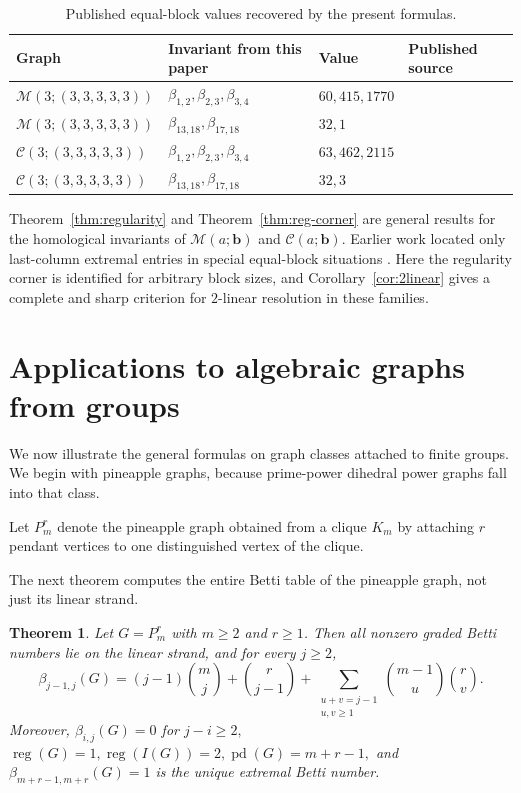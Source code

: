 \documentclass[12pt]{article}
\newtheorem{theorem}{Theorem}[section]
\theoremstyle{definition}
\theoremstyle{remark}
\DeclareMathOperator{\reg}{reg}
\DeclareMathOperator{\pd}{pd}
\newcommand{\MM}{\mathcal{M}}
\newcommand{\CC}{\mathcal{C}}
\newcommand{\bk}[1]{\mathbf{#1}}
\begin{document}
	\begin{table}[H]
		\centering
		\caption{Published equal-block values recovered by the present formulas.}
		\label{tab:published-compare}
		\begin{tabular}{@{}llll@{}}
			\toprule
			Graph & Invariant from this paper & Value & Published source \\ \midrule
			$\MM(3;(3,3,3,3,3))$ & $\beta_{1,2},\beta_{2,3},\beta_{3,4}$ & $60,415,1770$ & \cite{Rather2024} \\
			$\MM(3;(3,3,3,3,3))$ & $\beta_{13,18},\beta_{17,18}$ & $32,1$ & \cite{Rather2024} \\
			$\CC(3;(3,3,3,3,3))$ & $\beta_{1,2},\beta_{2,3},\beta_{3,4}$ & $63,462,2115$ & \cite{Rather2024} \\
			$\CC(3;(3,3,3,3,3))$ & $\beta_{13,18},\beta_{17,18}$ & $32,3$ & \cite{Rather2024} \\ \bottomrule
		\end{tabular}
	\end{table}
	
	
	
	Theorem~\ref{thm:regularity} and Theorem~\ref{thm:reg-corner} are general results for the homological invariants of $\MM(a;\bk{b})$ and $\CC(a;\bk{b})$. Earlier work located only last-column extremal entries in special equal-block situations \cite{Rather2024}. Here the regularity corner is identified for arbitrary block sizes, and Corollary~\ref{cor:2linear} gives a complete and sharp criterion for $2$-linear resolution in these families.
	
	\section{Applications to algebraic graphs from groups}\label{sec:groups}
	We now illustrate the general formulas on graph classes attached to finite groups. We begin with pineapple graphs, because prime-power dihedral power graphs fall into that class.
	
	 Let $P_m^r$ denote the pineapple graph obtained from a clique $K_m$ by attaching $r$ pendant vertices to one distinguished vertex of the clique.
	
	\medskip The next theorem computes the entire Betti table of the pineapple graph, not just its linear strand.
	
	\begin{theorem}\label{thm:pineapple}
		Let $G=P_m^r$ with $m\geq 2$ and $r\geq 1$. Then all nonzero graded Betti numbers lie on the linear strand, and for every $j\geq 2$,
		$$
		\beta_{j-1,j}(G)
		= (j-1)\binom{m}{j}
		+
		\binom{r}{j-1}
		+
		\sum_{\substack{u+v=j-1\\ u,v\geq 1}}
		\binom{m-1}{u}\binom{r}{v}.
		$$
		Moreover,
		$ \beta_{i,j}(G)=0$ for $j-i\geq 2, $ $ \reg(G)=1,  \reg(I(G))=2,  \pd(G)=m+r-1, $
		and
		$
		\beta_{m+r-1,m+r}(G)=1
		$
		is the unique extremal Betti number.
	\end{theorem}
	
\end{document}
